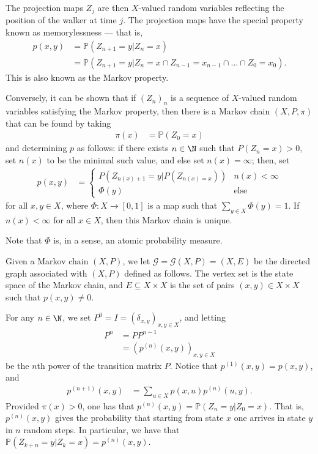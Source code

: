 \documentclass[10pt]{mypackage}
\begin{document}
The projection maps $Z_j$ are then $X$-valued random variables reflecting the position of the walker at time $j$. The projection maps have the special property known as memorylessness --- that is, 
\begin{align*}
  p\left( x,y \right) &= \mathbb{P}\left( Z_{n+1}=y|Z_n = x \right)\\
                      &= \mathbb{P}\left( Z_{n+1}=y|Z_n = x\cap Z_{n-1}=x_{n-1}\cap \dots\cap Z_0=x_0 \right).
\end{align*}
This is also known as the Markov property.

Conversely, it can be shown that if $\left( Z_n \right)_n$ is a sequence of $X$-valued random variables satisfying the Markov property, then there is a Markov chain $\left( X,P,\pi \right)$ that can be found by taking
\begin{align*}
  \pi(x) &= \mathbb{P}\left( Z_0 = x \right)
\end{align*}
and determining $p$ as follows: if there exists $n\in \N$ such that $P\left( Z_n=x \right) > 0$, set $n(x)$ to be the minimal such value, and else set $n(x) = \infty$; then, set
\begin{align*}
  p\left( x,y \right) &= \begin{cases}
    P\left( Z_{n(x)+1}=y | P\left( Z_{n(x) = x} \right) \right) & n(x) < \infty\\
    \Phi(y)& \text{else}
  \end{cases}
\end{align*}
for all $x,y\in X$, where $\Phi\colon X\to [0,1]$ is a map such that $\sum_{y\in X}\Phi(y) = 1$. If $n(x) < \infty$ for all $x\in X$, then this Markov chain is unique.

Note that $\Phi$ is, in a sense, an atomic probability measure.
\begin{definition}
  Given a Markov chain $\left( X,P \right)$, we let $ \mathcal{G} = \mathcal{G}\left( X,P \right) = \left( X,E \right) $ be the directed graph associated with $\left( X,P \right)$ defined as follows. The vertex set is the state space of the Markov chain, and $E\subseteq X\times X$ is the set of pairs $\left( x,y \right)\in X\times X$ such that $p\left( x,y \right)\neq 0$.
\end{definition}
For any $n\in \N$, we set $P^0 = I = \left( \delta_{x,y} \right)_{x,y\in X}$, and letting
\begin{align*}
  P^n &= PP^{n-1}\\
      &= \left( p^{(n)}\left( x,y \right) \right)_{x,y\in X}
\end{align*}
be the $n$th power of the transition matrix $P$. Notice that $p^{(1)}(x,y) = p(x,y)$, and
\begin{align*}
  p^{(n+1)}(x,y) &= \sum_{u\in X}p\left( x,u \right)p^{(n)}\left( u,y \right).
\end{align*}
Provided $\pi(x) > 0$, one has that $p^{(n)}(x,y) = \mathbb{P}\left( Z_n=y|Z_0=x \right)$. That is, $p^{(n)}(x,y)$ gives the probability that starting from state $x$ one arrives in state $y$ in $n$ random steps. In particular, we have that $ \mathbb{P}\left( Z_{k+n}=y|Z_k=x \right) = p^{(n)}(x,y) $.
\end{document}
